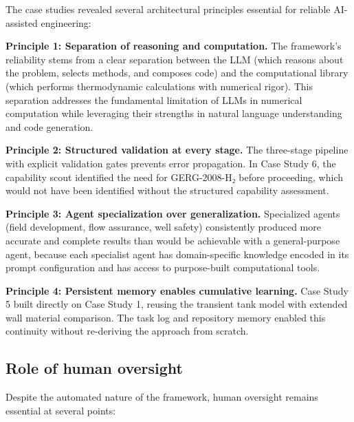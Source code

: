 \documentclass[review,3p]{elsarticle}
\begin{document}
The case studies revealed several architectural principles essential for reliable AI-assisted engineering:

\textbf{Principle 1: Separation of reasoning and computation.} The framework's reliability stems from a clear separation between the LLM (which reasons about the problem, selects methods, and composes code) and the computational library (which performs thermodynamic calculations with numerical rigor). This separation addresses the fundamental limitation of LLMs in numerical computation while leveraging their strengths in natural language understanding and code generation.

\textbf{Principle 2: Structured validation at every stage.} The three-stage pipeline with explicit validation gates prevents error propagation. In Case Study 6, the capability scout identified the need for GERG-2008-H₂ before proceeding, which would not have been identified without the structured capability assessment.

\textbf{Principle 3: Agent specialization over generalization.} Specialized agents (field development, flow assurance, well safety) consistently produced more accurate and complete results than would be achievable with a general-purpose agent, because each specialist agent has domain-specific knowledge encoded in its prompt configuration and has access to purpose-built computational tools.

\textbf{Principle 4: Persistent memory enables cumulative learning.} Case Study 5 built directly on Case Study 1, reusing the transient tank model with extended wall material comparison. The task log and repository memory enabled this continuity without re-deriving the approach from scratch.

\subsection{Role of human oversight}

Despite the automated nature of the framework, human oversight remains essential at several points:
\end{document}
